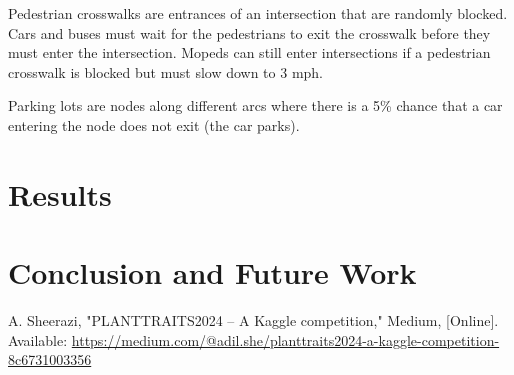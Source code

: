 \documentclass[conference]{IEEEtran}
\begin{document}
Pedestrian crosswalks are entrances of an intersection that are randomly blocked.
Cars and buses must wait for the pedestrians to exit the crosswalk before they must enter the intersection.
Mopeds can still enter intersections if a pedestrian crosswalk is blocked but must slow down to 3 mph.

Parking lots are nodes along different arcs where there is a 5\% chance that a car entering the node does not exit (the car parks).


\section{Results}


\section{Conclusion and Future Work}


\begin{thebibliography}{1}

A. Sheerazi, "PLANTTRAITS2024 -- A Kaggle competition," Medium, [Online]. Available: \url{https://medium.com/@adil.she/planttraits2024-a-kaggle-competition-8c6731003356}

\end{thebibliography}




\end{document}
